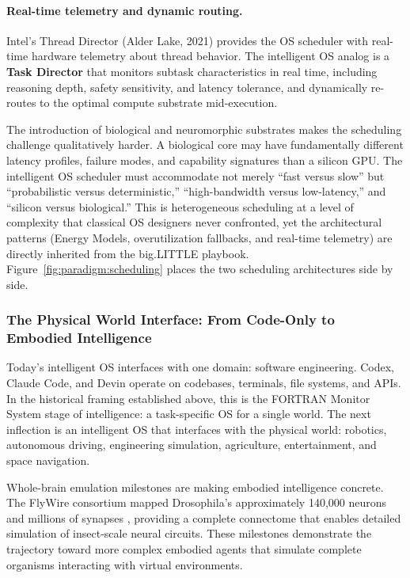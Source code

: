 \paragraph{Real-time telemetry and dynamic routing.}
Intel's Thread Director (Alder Lake, 2021) provides the OS scheduler with real-time hardware telemetry about thread behavior. The intelligent OS analog is a \textbf{Task Director} that monitors subtask characteristics in real time, including reasoning depth, safety sensitivity, and latency tolerance, and dynamically re-routes to the optimal compute substrate mid-execution.

The introduction of biological and neuromorphic substrates makes the scheduling challenge qualitatively harder. A biological core may have fundamentally different latency profiles, failure modes, and capability signatures than a silicon GPU. The intelligent OS scheduler must accommodate not merely ``fast versus slow'' but ``probabilistic versus deterministic,'' ``high-bandwidth versus low-latency,'' and ``silicon versus biological.'' This is heterogeneous scheduling at a level of complexity that classical OS designers never confronted, yet the architectural patterns (Energy Models, overutilization fallbacks, and real-time telemetry) are directly inherited from the big.LITTLE playbook.
Figure~\ref{fig:paradigm:scheduling} places the two scheduling architectures side by side.


\subsubsection{The Physical World Interface: From Code-Only to Embodied Intelligence}

Today's intelligent OS interfaces with one domain: software engineering. Codex, Claude Code, and Devin operate on codebases, terminals, file systems, and APIs. In the historical framing established above, this is the FORTRAN Monitor System stage of intelligence: a task-specific OS for a single world. The next inflection is an intelligent OS that interfaces with the physical world: robotics, autonomous driving, engineering simulation, agriculture, entertainment, and space navigation.

Whole-brain emulation milestones are making embodied intelligence concrete. The FlyWire consortium mapped Drosophila's approximately 140,000 neurons and millions of synapses \cite{flywire_2024}, providing a complete connectome that enables detailed simulation of insect-scale neural circuits. These milestones demonstrate the trajectory toward more complex embodied agents that simulate complete organisms interacting with virtual environments.

